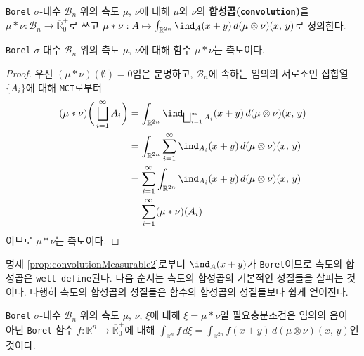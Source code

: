 \begin{definition}
    \texttt{Borel} $\sigma$-대수 $\mathcal{B}_n$ 위의 측도 $\mu,\,\nu$에 대해 $\mu$와 $\nu$의 \textbf{합성곱(\texttt{convolution})}을 $\mu*\nu:\mathcal{B}_n\to\overline{\mathbb{R}}^+_0$로 쓰고 $\mu*\nu:A\mapsto\int_{\mathbb{R}^{2n}}\ind_A(x+y)\,d(\mu\otimes\nu)(x,\,y)$로 정의한다.
\end{definition}

\begin{proposition}
    \texttt{Borel} $\sigma$-대수 $\mathcal{B}_n$ 위의 측도 $\mu,\,\nu$에 대해 함수 $\mu*\nu$는 측도이다.
\end{proposition}

\begin{proof}
    우선 $(\mu*\nu)(\emptyset)=0$임은 분명하고, $\mathcal{B}_n$에 속하는 임의의 서로소인 집합열 $\{A_i\}$에 대해 \texttt{MCT}로부터
    \begin{align*}
        (\mu*\nu)\bigg(\bigsqcup_{i=1}^\infty A_i\bigg)&=\int_{\mathbb{R}^{2n}}\ind_{\bigsqcup_{i=1}^\infty A_i}(x+y)\,d(\mu\otimes\nu)(x,\,y)\\
        &=\int_{\mathbb{R}^{2n}}\sum_{i=1}^\infty\ind_{A_i}(x+y)\,d(\mu\otimes\nu)(x,\,y)\\
        &=\sum_{i=1}^\infty\int_{\mathbb{R}^{2n}}\ind_{A_i}(x+y)\,d(\mu\otimes\nu)(x,\,y)\\
        &=\sum_{i=1}^\infty(\mu*\nu)(A_i)
    \end{align*}
    이므로 $\mu*\nu$는 측도이다.
\end{proof}

명제 \ref{prop:convolutionMeasurable2}로부터 $\ind_A(x+y)$가 \texttt{Borel}이므로 측도의 합성곱은 \texttt{well-define}된다. 다음 순서는 측도의 합성곱의 기본적인 성질들을 살피는 것이다. 다행히 측도의 합성곱의 성질들은 함수의 합성곱의 성질들보다 쉽게 얻어진다.

\begin{theorem}\label{thm:convolutionInt}
    \texttt{Borel} $\sigma$-대수 $\mathcal{B}_n$ 위의 측도 $\mu,\,\nu,\,\xi$에 대해 $\xi=\mu*\nu$일 필요충분조건은 임의의 음이 아닌 \texttt{Borel} 함수 $f:\mathbb{R}^n\to\overline{\mathbb{R}}^+_0$에 대해 $\int_{\mathbb{R}^n}f\,d\xi=\int_{\mathbb{R}^{2n}}f(x+y)\,d(\mu\otimes\nu)(x,\,y)$인 것이다.
\end{theorem}


